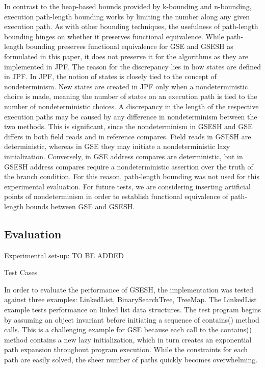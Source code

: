 In contrast to the heap-based bounds provided by k-bounding and n-bounding, execution path-length bounding works by limiting the number along any given execution path. As with other bounding techniques, the usefulness of path-length bounding hinges on whether it preserves functional equivalence. While path-length bounding preserves functional equivalence for GSE and GSESH as formulated in this paper, it does not preserve it for the algorithms as they are implemented in JPF. The reason for the discrepancy lies in how states are defined in JPF. In JPF, the notion of states is closely tied to the concept of nondeterminism. New states are created in JPF only when a nondeterministic choice is made, meaning the number of states on an execution path is tied to the number of nondeterministic choices. A discrepancy in the length of the respective execution paths may be caused by any difference in nondeterminism between the two methods. This is significant, since the nondeterminism in GSESH and GSE differs in both field reads and in reference compares. Field reads in GSESH are deterministic, whereas in GSE they may initiate a nondeterministic lazy initialization. Conversely, in GSE address compares are deterministic, but in GSESH address compares require a nondeterministic assertion over the truth of the branch condition. For this reason, path-length bounding was not used for this experimental evaluation. For future tests, we are considering inserting artificial points of nondeterminism in order to establish functional equivalence of path-length bounds between GSE and GSESH. 

\subsection{Evaluation} 
Experimental set-up: TO BE ADDED

Test Cases

In order to evaluate the performance of GSESH, the implementation was tested against three examples: LinkedList, BinarySearchTree, TreeMap.
The LinkedList example tests performance on linked list data structures. The test program begins by assuming an object invariant before initiating a sequence of contains() method calls. This is a challenging example for GSE because each call to the contains() method contains a new lazy initialization, which in turn creates an exponential path expansion throughout program execution. While the constraints for each path are easily solved, the sheer number of paths quickly becomes overwhelming.

